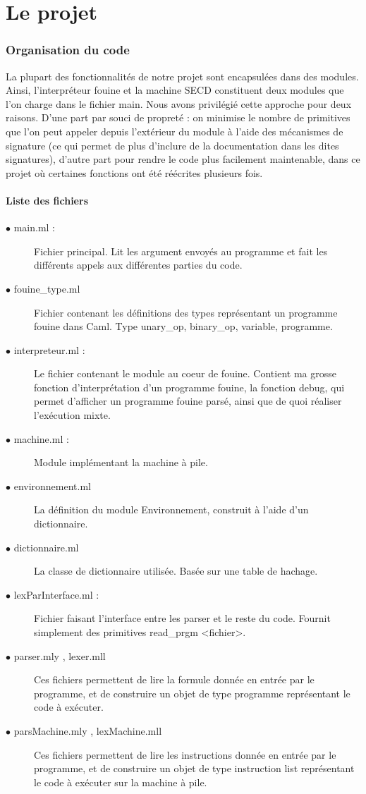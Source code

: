\part{Le projet}

\section{Organisation du code}

La plupart des fonctionnalités de notre projet sont encapsulées dans des modules. Ainsi, l'interpréteur fouine et la machine SECD constituent deux modules que l'on charge dans le fichier main. Nous avons privilégié cette approche pour deux raisons. D'une part par souci de propreté : on minimise le nombre de primitives que l'on peut appeler depuis l'extérieur du module à l'aide des mécanismes de signature (ce qui permet de plus d'inclure de la documentation dans les dites signatures), d'autre part pour rendre le code plus facilement maintenable, dans ce projet où certaines fonctions ont été réécrites plusieurs fois.

\subsection{Liste des fichiers}

\begin{description}
 \item[$\bullet$ main.ml :] Fichier principal. Lit les argument envoyés au programme et fait les différents appels aux différentes parties du code.
 \item[$\bullet$ fouine\_type.ml] Fichier contenant les définitions des types représentant un programme fouine dans Caml. Type unary\_op, binary\_op, variable, programme.
 \item[$\bullet$ interpreteur.ml :] Le fichier contenant le module au coeur de fouine. Contient ma grosse fonction d'interprétation d'un programme fouine, la fonction debug, qui permet d'afficher un programme fouine parsé, ainsi que de quoi réaliser l'exécution mixte.
 \item[$\bullet$ machine.ml :] Module implémentant la machine à pile.
 \item[$\bullet$ environnement.ml] La définition du module Environnement, construit à l'aide d'un dictionnaire.
 \item[$\bullet$ dictionnaire.ml] La classe de dictionnaire utilisée. Basée sur une table de hachage.
 \item[$\bullet$ lexParInterface.ml :] Fichier faisant l'interface entre les parser et le reste du code. Fournit simplement des primitives read\_prgm <fichier>.
 \item[$\bullet$ parser.mly , lexer.mll] Ces fichiers permettent de lire la formule donnée en entrée par le programme, et de construire un objet de type programme représentant le code à exécuter.
 \item[$\bullet$ parsMachine.mly , lexMachine.mll] Ces fichiers permettent de lire les instructions donnée en entrée par le programme, et de construire un objet de type instruction list représentant le code à exécuter sur la machine à pile.
\end{description}


